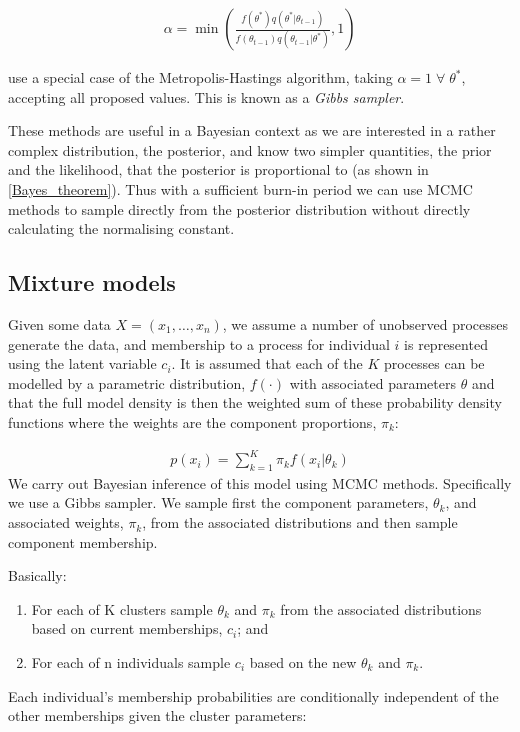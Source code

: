 \documentclass[11pt]{article} %
\begin{document}
\begin{align} \label{metropolis_hastings_alpha}
\alpha = \min\left(\frac{f(\theta^*) q(\theta^*|\theta_{t-1})}{f(\theta_{t-1})q(\theta_{t-1}|\theta^*)}, 1\right)
\end{align}

\citet{GemanStochasticRelaxationGibbs1984} use a special case of the Metropolis-Hastings algorithm, taking $\alpha = 1 \; \forall \; \theta^*$, accepting all proposed values. This is known as a \emph{Gibbs sampler}.

These methods are useful in a Bayesian context as we are interested in a rather complex distribution, the posterior, and know two simpler quantities, the prior and the likelihood, that the posterior is proportional to (as shown in \eqref{Bayes_theorem}). Thus with a sufficient burn-in period we can use MCMC methods to sample directly from the posterior distribution without directly calculating the normalising constant.

\subsection{Mixture models} \label{mixture_models}
Given some data $X = (x_1, \ldots, x_n)$, we assume a number of unobserved processes generate the data, and membership to a process for individual $i$ is represented using the latent variable $c_i$. It is assumed that each of the $K$ processes can be modelled by a parametric distribution, $f(\cdot)$ with associated parameters $\theta$ and that the full model density is then the weighted sum of these probability density functions where the weights are the component proportions, $\pi_k$:

\begin{align}
p(x_i) = \sum_{k=1}^K \pi_k f(x_i | \theta_k)
\end{align}
We carry out Bayesian inference of this model using MCMC methods. Specifically we use a Gibbs sampler. We sample first the component parameters, $\theta_k$, and associated weights, $\pi_k$, from the associated distributions and then sample component membership.

Basically:
\begin{enumerate}
 \item For each of K clusters sample $\theta_k$ and $\pi_k$ from the associated distributions based on current memberships, $c_i$; and
 \item For each of n individuals sample $c_i$ based on the new $\theta_k$ and $\pi_k$.
\end{enumerate}
Each individual's membership probabilities are conditionally independent of the other memberships given the cluster parameters:
\end{document}
